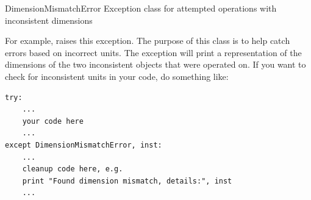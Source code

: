 \documentclass[letterpaper,10pt,english]{manual}
\begin{document}
\hypertarget{brian.DimensionMismatchError}{}\begin{excdesc}{DimensionMismatchError}
Exception class for attempted operations with inconsistent dimensions

For example,  raises this exception. The purpose of this
class is to help catch errors based on incorrect units. The exception will
print a representation of the dimensions of the two inconsistent objects
that were operated on. If you want to check for inconsistent units in your
code, do something like:

\begin{Verbatim}[commandchars=@\[\]]
try:
    ...
    your code here
    ...
except DimensionMismatchError, inst:
    ...
    cleanup code here, e.g.
    print "Found dimension mismatch, details:", inst
    ...
\end{Verbatim}
\end{excdesc}
\end{document}
